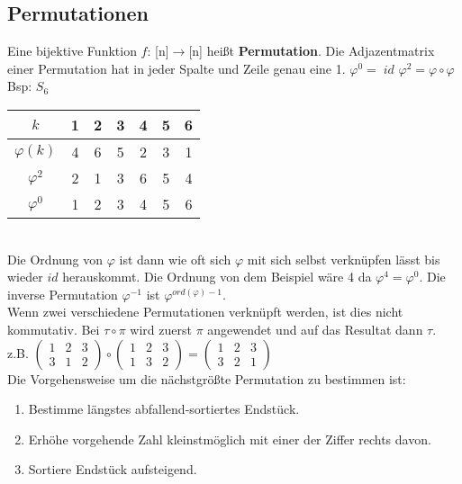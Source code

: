 \documentclass[11pt]{article}
\begin{document}
\subsection{Permutationen}
Eine bijektive Funktion $f\colon\,${[}n{]}$\to${[}n{]} hei{\ss}t {\bfseries Permutation}. Die Adjazentmatrix einer Permutation hat in jeder Spalte und Zeile genau eine 1.\hspace{5mm} $\varphi ^{0} =\; id$\hspace{5mm} $\varphi ^2 = \varphi \circ \varphi$ \\
Bsp: $S_6$\\
\begin{tabular}{c|c|c|c|c|c|c}
$k$ & 1 & 2 & 3 & 4 & 5 & 6 \\ \hline
$\varphi (k)$ & 4 & 6 & 5 & 2 & 3 & 1 \\ \hline
$\varphi ^2$ & 2 & 1 & 3 & 6 & 5 & 4 \\ \hline
$\varphi ^0$ & 1 & 2 & 3 & 4 & 5 & 6 \\

\end{tabular}\\
Die Ordnung von $\varphi$ ist dann wie oft sich $\varphi$ mit sich selbst verkn{\"u}pfen l{\"a}sst bis wieder $id$ herauskommt. Die Ordnung von dem Beispiel w{\"a}re 4 da $\varphi ^4 = \varphi ^0$.
Die inverse Permutation $\varphi ^{-1}$ ist $\varphi ^{ord(\varphi)-1}$.\\
Wenn zwei verschiedene Permutationen verkn{\"u}pft werden, ist dies nicht kommutativ. Bei $\tau \circ \pi$ wird zuerst $\pi$ angewendet und auf das Resultat dann $\tau$.\\
z.B.
${\begin{pmatrix}1&2&3\\3&1&2\end{pmatrix}} \circ {\begin{pmatrix}1&2&3\\1&3&2\end{pmatrix}}={\begin{pmatrix}1&2&3\\3&2&1\end{pmatrix}}$\\
Die Vorgehensweise um die n{\"a}chstgr{\"o}{\ss}te Permutation zu bestimmen ist:\begin{enumerate}
\item Bestimme l{\"a}ngstes abfallend-sortiertes Endst{\"u}ck.
\item Erh{\"o}he vorgehende Zahl kleinstm{\"o}glich mit einer der Ziffer rechts davon.
\item Sortiere Endst{\"u}ck aufsteigend.
\end{enumerate}
\end{document}
